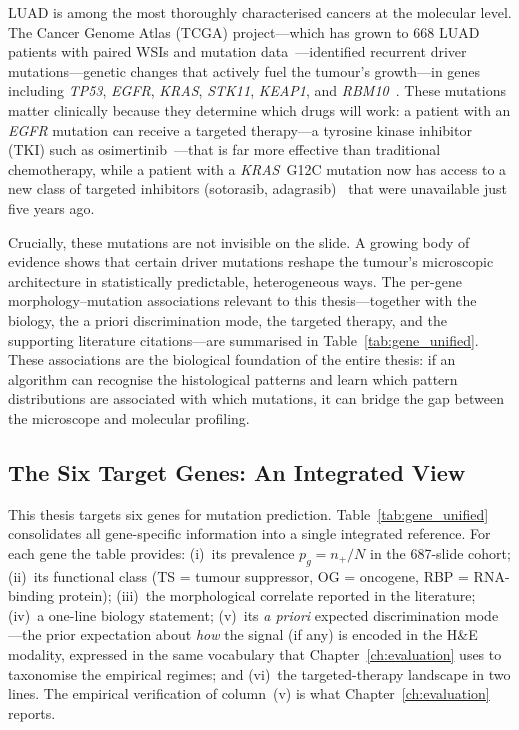 \bigskip

LUAD is among the most thoroughly characterised cancers at the molecular
level.
The Cancer Genome Atlas (TCGA) project---which has grown to
668 LUAD patients with paired WSIs and mutation
data~\cite{tcga2014luad}---identified recurrent driver mutations---genetic changes
that actively fuel the tumour's growth---in genes including
\textit{TP53}, \textit{EGFR}, \textit{KRAS}, \textit{STK11},
\textit{KEAP1}, and \textit{RBM10}~\cite{tcga2014luad}.
These mutations matter clinically because they determine which drugs will
work: a patient with an \textit{EGFR} mutation can receive a targeted
therapy---a tyrosine kinase inhibitor (TKI) such as
osimertinib~\cite{soria2018flaura}---that is far more effective than
traditional chemotherapy,
while a patient with a \textit{KRAS}~G12C mutation now has access to a
new class of targeted inhibitors (sotorasib,
adagrasib)~\cite{skoulidis2021codebreak} that were unavailable just
five years ago.

Crucially, these mutations are not invisible on the slide.
A growing body of evidence shows that certain driver mutations
reshape the tumour's microscopic architecture in statistically
predictable, heterogeneous ways.
The per-gene morphology--mutation associations relevant to this
thesis---together with the biology, the a priori discrimination
mode, the targeted therapy, and the supporting literature
citations---are summarised in Table~\ref{tab:gene_unified}.
These associations are the biological foundation of the entire
thesis: if an algorithm can recognise the histological patterns and
learn which pattern distributions are associated with which mutations,
it can bridge the gap between the microscope and molecular profiling.


\subsection{The Six Target Genes: An Integrated View}
\label{sec:uc:six_genes}

This thesis targets six genes for mutation prediction.
Table~\ref{tab:gene_unified} consolidates all gene-specific information
into a single integrated reference.
For each gene the table provides:
(i)~its prevalence $p_g = n_+/N$ in the 687-slide cohort;
(ii)~its functional class (TS = tumour suppressor, OG = oncogene,
RBP = RNA-binding protein);
(iii)~the morphological correlate reported in the literature;
(iv)~a one-line biology statement;
(v)~its \emph{a priori} expected discrimination mode---the prior
expectation about \emph{how} the signal (if any) is encoded in the
H\&E modality, expressed in the same vocabulary that
Chapter~\ref{ch:evaluation} uses to taxonomise the empirical regimes;
and (vi)~the targeted-therapy landscape in two lines.
The empirical verification of column~(v) is what
Chapter~\ref{ch:evaluation} reports.

